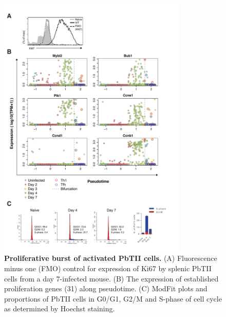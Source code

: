 \begin{figure}
    \centering
    \includegraphics[width=0.8\textwidth]{"Fig S16 rev3"}
    \caption[Proliferative burst of activated PbTII cells]{\textbf{Proliferative burst of activated PbTII cells.} (A) Fluorescence minus one (FMO) control for expression of Ki67 by splenic PbTII cells from a day 7-infected mouse. (B) The expression of established proliferation genes (31) along pseudotime. (C) ModFit plots and proportions of PbTII cells in G0/G1, G2/M and S-phase of cell cycle as determined by Hoechst staining.}
    \label{fig:ms16}
\end{figure}

